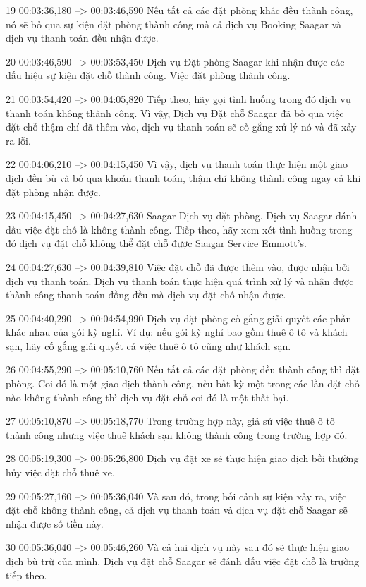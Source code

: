19
00:03:36,180 --> 00:03:46,590
Nếu tất cả các đặt phòng khác đều thành công, nó sẽ bỏ qua sự kiện đặt phòng thành công mà cả dịch vụ Booking Saagar và dịch vụ thanh toán đều nhận được.

20
00:03:46,590 --> 00:03:53,450
Dịch vụ Đặt phòng Saagar khi nhận được các dấu hiệu sự kiện đặt chỗ thành công.  Việc đặt phòng thành công.

21
00:03:54,420 --> 00:04:05,820
Tiếp theo, hãy gọi tình huống trong đó dịch vụ thanh toán không thành công.  Vì vậy, Dịch vụ Đặt chỗ Saagar đã bỏ qua việc đặt chỗ thậm chí đã thêm vào, dịch vụ thanh toán sẽ cố gắng xử lý nó và đã xảy ra lỗi.

22
00:04:06,210 --> 00:04:15,450
Vì vậy, dịch vụ thanh toán thực hiện một giao dịch đền bù và bỏ qua khoản thanh toán, thậm chí không thành công ngay cả khi đặt phòng nhận được.

23
00:04:15,450 --> 00:04:27,630
Saagar Dịch vụ đặt phòng.  Dịch vụ Saagar đánh dấu việc đặt chỗ là không thành công.  Tiếp theo, hãy xem xét tình huống trong đó dịch vụ đặt chỗ không thể đặt chỗ được Saagar Service Emmott's.

24
00:04:27,630 --> 00:04:39,810
Việc đặt chỗ đã được thêm vào, được nhận bởi dịch vụ thanh toán.  Dịch vụ thanh toán thực hiện quá trình xử lý và nhận được thành công thanh toán đồng đều mà dịch vụ đặt chỗ nhận được.

25
00:04:40,290 --> 00:04:54,990
Dịch vụ đặt phòng cố gắng giải quyết các phần khác nhau của gói kỳ nghỉ.  Ví dụ: nếu gói kỳ nghỉ bao gồm thuê ô tô và khách sạn, hãy cố gắng giải quyết cả việc thuê ô tô cũng như khách sạn.

26
00:04:55,290 --> 00:05:10,760
Nếu tất cả các đặt phòng đều thành công thì đặt phòng.  Coi đó là một giao dịch thành công, nếu bất kỳ một trong các lần đặt chỗ nào không thành công thì dịch vụ đặt chỗ coi đó là một thất bại.

27
00:05:10,870 --> 00:05:18,770
Trong trường hợp này, giả sử việc thuê ô tô thành công nhưng việc thuê khách sạn không thành công trong trường hợp đó.

28
00:05:19,300 --> 00:05:26,800
Dịch vụ đặt xe sẽ thực hiện giao dịch bồi thường hủy việc đặt chỗ thuê xe.

29
00:05:27,160 --> 00:05:36,040
Và sau đó, trong bối cảnh sự kiện xảy ra, việc đặt chỗ không thành công, cả dịch vụ thanh toán và dịch vụ đặt chỗ Saagar sẽ nhận được số tiền này.

30
00:05:36,040 --> 00:05:46,260
Và cả hai dịch vụ này sau đó sẽ thực hiện giao dịch bù trừ của mình.  Dịch vụ đặt chỗ Saagar sẽ đánh dấu việc đặt chỗ là trường tiếp theo.

